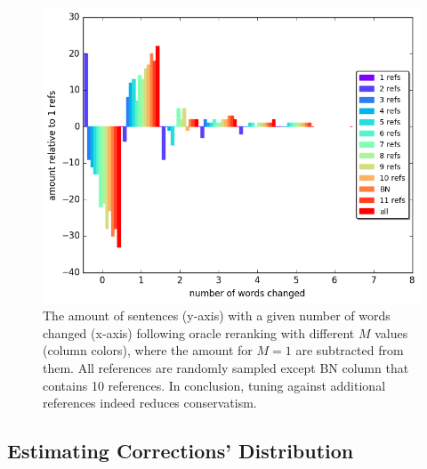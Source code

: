 \documentclass[letterpaper, 11pt]{article}
\begin{document}
\begin{figure}
	\vspace{-1em}
	\includegraphics[width=0.9\columnwidth]{words_relative_differences_hist_reranking}
	\caption{The amount of sentences (y-axis) with a given number of words changed (x-axis) following oracle reranking with different $M$ values (column colors), where the amount for $M=1$ are subtracted from them.
          All references are randomly sampled except BN column that contains  10 references.
		In conclusion, tuning against additional references indeed reduces conservatism.
		\label{fig:reranking_word_change}
        }
	\vspace{-0.5cm}
\end{figure}
%
\subsection{Estimating Corrections' Distribution}\label{subsec:corrections_distribution}
%
\end{document}
